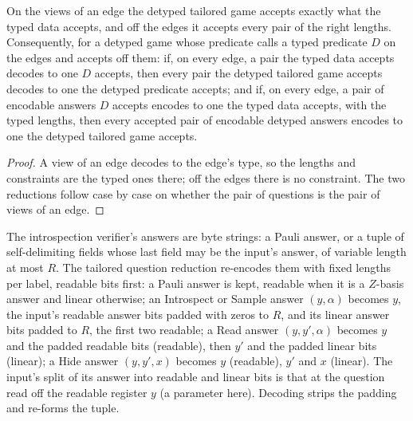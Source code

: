 \begin{lemma}
\label{lem:tailored-detyping}
\leanok
On the views of an edge the detyped tailored game accepts exactly what the typed data accepts,
and off the edges it accepts every pair of the right lengths. Consequently, for a detyped game
whose predicate calls a typed predicate $D$ on the edges and accepts off them: if, on every
edge, a pair the typed data accepts decodes to one $D$ accepts, then every pair the detyped
tailored game accepts decodes to one the detyped predicate accepts; and if, on every edge, a
pair of encodable answers $D$ accepts encodes to one the typed data accepts, with the typed
lengths, then every accepted pair of encodable detyped answers encodes to one the detyped
tailored game accepts.
\end{lemma}

\begin{proof}
\leanok
A view of an edge decodes to the edge's type, so the lengths and constraints are the typed ones
there; off the edges there is no constraint. The two reductions follow case by case on whether
the pair of questions is the pair of views of an edge.
\end{proof}

\begin{definition}
\label{def:intro-layout}
\leanok
The introspection verifier's answers are byte strings: a Pauli answer, or a tuple of
self-delimiting fields whose last field may be the input's answer, of variable length at most
$R$. The tailored question reduction re-encodes them with fixed lengths per label, readable
bits first: a Pauli answer is kept, readable when it is a $Z$-basis answer and linear otherwise;
an Introspect or Sample answer $(y, \alpha)$ becomes $y$, the input's readable answer bits padded
with zeros to $R$, and its linear answer bits padded to $R$, the first two readable; a Read
answer $(y, y', \alpha)$ becomes $y$ and the padded readable bits (readable), then $y'$ and the
padded linear bits (linear); a Hide answer $(y, y', x)$ becomes $y$ (readable), $y'$ and $x$
(linear). The input's split of its answer into readable and linear bits is that at the question
read off the readable register $y$ (a parameter here). Decoding strips the padding and
re-forms the tuple.
\end{definition}

